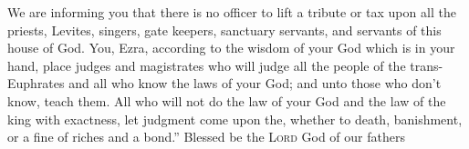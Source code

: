 \begin{enumerate}[align=center]
     We are informing you that there is no officer to lift a tribute or tax upon all the priests, Levites, singers, gate keepers, sanctuary servants, and servants of this house of God.%
     You, Ezra, according to the wisdom of your God which is in your hand, place judges and magistrates who will judge all the people of the trans-Euphrates and all who know the laws of your God; and unto those who don't know, teach them.%
     All who will not do the law of your God and the law of the king with exactness, let judgment come upon the, whether to death, banishment, or a fine of riches and a bond.''%
     Blessed be the \textsc{Lord} God of our fathers%
\end{enumerate}
